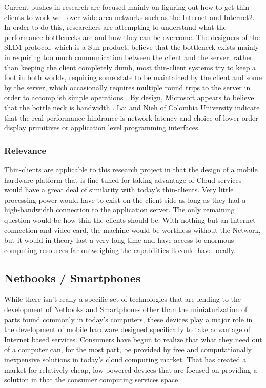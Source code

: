 \documentclass[12pt,oneside,letterpaper]{article}
\begin{document}
Current pushes in research are focused mainly on figuring out how to get
thin-clients to work well over wide-area networks such as the Internet and
Internet2.  In order to do this, researchers are attempting to understand what
the performance bottlenecks are and how they can be overcome.  The designers of
the SLIM protocol, which is a Sun product, believe that the bottleneck exists
mainly in requiring too much communication between the client and the server;
rather than keeping the client completely dumb, most thin-client systems try to
keep a foot in both worlds, requiring some state to be maintained by the client
and some by the server, which occasionally requires multiple round trips to the
server in order to accomplish simple operations \citep{schmidt1999}.  By design,
Microsoft appears to believe that the bottle neck is bandwidth \citep{lai2002}.
Lai and Nieh of Colombia University indicate that the real performance hindrance
is network latency and choice of lower order display primitives or application
level programming interfaces.

\subsubsection{Relevance}

Thin-clients are applicable to this research project in that the design of a
mobile hardware platform that is fine-tuned for taking advantage of Cloud
services would have a great deal of similarity with today's thin-clients.  Very
little processing power would have to exist on the client side as long as they
had a high-bandwidth connection to the application server.  The only remaining
question would be how thin the clients should be.  With nothing but an Internet
connection and video card, the machine would be worthless without the Network,
but it would in theory last a very long time and have access to enormous
computing resources far outweighing the capabilities it could have locally.

\subsection{Netbooks / Smartphones}

While there isn't really a specific set of technologies that are lending to the
development of Netbooks and Smartphones other than the miniaturization of parts
found commonly in today's computers, these devices play a major role in the
development of mobile hardware designed specifically to take advantage of
Internet based services.  Consumers have begun to realize that what they need
out of a computer can, for the most part, be provided by free and
computationally inexpensive solutions in today's cloud computing market.  That
has created a market for relatively cheap, low powered devices that are focused
on providing a solution in that the consumer computing services space.
\end{document}
